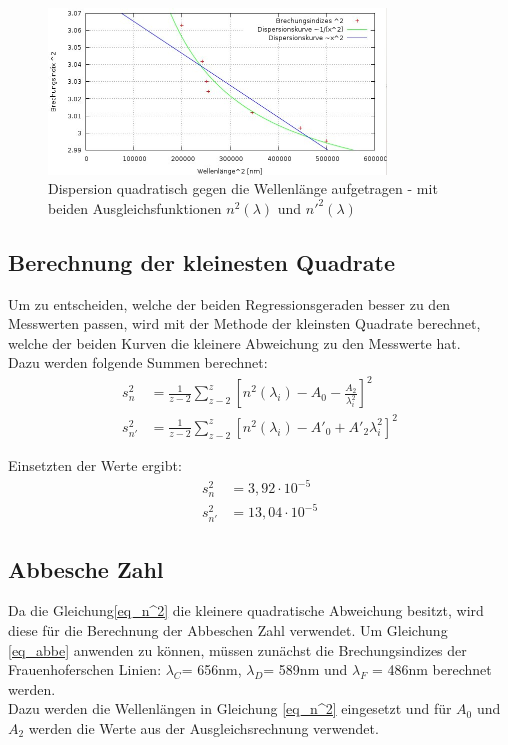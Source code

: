 \begin{figure}[htbp]
\includegraphics[width=0.8\textwidth]{pics/kurve.jpeg}
\caption{Dispersion quadratisch gegen die Wellenlänge aufgetragen - mit beiden Ausgleichsfunktionen $n^2(\lambda)$ und $n'^2(\lambda)$}
\label{kurve}
\end{figure}

\subsection{Berechnung der kleinesten Quadrate}
Um zu entscheiden, welche der beiden Regressionsgeraden besser zu den Messwerten passen, wird mit der Methode der kleinsten Quadrate berechnet, welche der beiden Kurven die kleinere Abweichung zu den Messwerte hat.\\
Dazu werden folgende Summen berechnet:
\begin{align}
s^2_n &= \frac{1}{z-2}\sum^z_{z-2}\left[n^2(\lambda_i) - A_0 - \frac{A_2}{\lambda^2_i}\right]^2\\
s^2_{n'} &= \frac{1}{z-2}\sum^z_{z-2}\left[n^2(\lambda_i) - A'_0 +A'_2\lambda^2_i\right]^2
\end{align}

Einsetzten der Werte ergibt:
\begin{align*}
s^2_n &=3,92 \cdot10^{-5}\\
s^2_{n'}&=13,04\cdot10^{-5}
\end{align*}

\subsection{Abbesche Zahl}
Da die Gleichung\eqref{eq_n^2} die kleinere quadratische Abweichung besitzt, wird diese für die Berechnung der Abbeschen Zahl verwendet. Um Gleichung \eqref{eq_abbe} anwenden zu können, müssen zunächst die Brechungsindizes der  Frauenhoferschen Linien: $\lambda_C$= 656nm, $\lambda_D$= 589nm und $\lambda_F$ = 486nm berechnet werden.\\
Dazu werden die Wellenlängen in Gleichung \eqref{eq_n^2} eingesetzt und für $A_0$ und $A_2$ werden die Werte aus der Ausgleichsrechnung verwendet.\\

